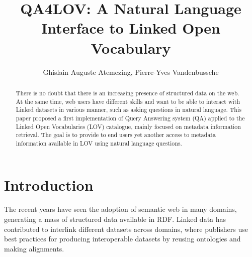 \documentclass[runningheads,a4paper]{llncs}
\begin{document}
\title{QA4LOV: A Natural Language Interface to Linked Open Vocabulary}

\author{ Ghislain Auguste Atemezing, Pierre-Yves Vandenbussche }


\maketitle



\begin{abstract}

There is no doubt that there is an increasing presence of structured data on the web. At the same time, web users have different skills and want to be able to interact with Linked datasets in various manner, such as asking questions in natural language. 
This paper proposed a first implementation of Query Answering system (QA) applied to the Linked Open Vocabularies (LOV) catalogue, mainly focused on metadata information retrieval. The goal is to provide to end users yet another access to metadata information available in LOV  using natural language questions.


\end{abstract}




\section{Introduction}\label{sec:introduction}
The recent years have seen the adoption of semantic web in many domains, generating a mass of structured data available in RDF. Linked data has contributed to interlink different datasets across domains, where publishers use best practices for producing interoperable datasets by reusing ontologies and making alignments. 
\end{document}
